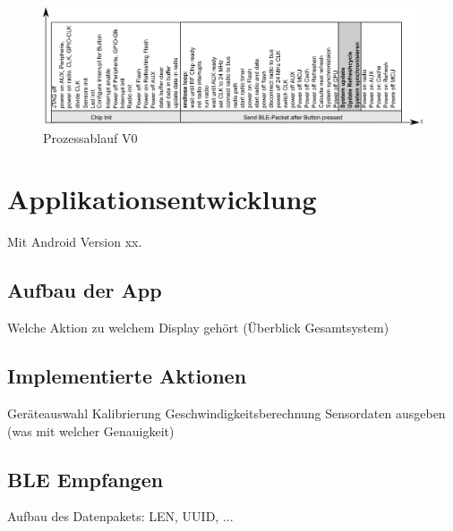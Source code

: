 \begin{figure}
  \includegraphics[width=1.0\textwidth]{../ressources/SimpleLink/V0Sendeablauf.png}
  \caption{Prozessablauf V0}
\end{figure}




\section{Applikationsentwicklung}

Mit Android Version xx.

\subsection{Aufbau der App}

Welche Aktion zu welchem Display gehört (Überblick Gesamtsystem)


\subsection{Implementierte Aktionen}
Geräteauswahl
Kalibrierung
Geschwindigkeitsberechnung
Sensordaten ausgeben (was mit welcher Genauigkeit)

\subsection{BLE Empfangen}

Aufbau des Datenpakets: 
LEN, UUID, ...






